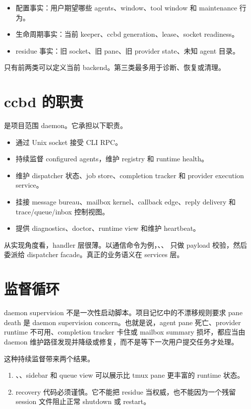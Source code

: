 \begin{itemize}
  \item 配置事实：用户期望哪些 agents、window、tool window 和 maintenance 行为。
  \item 生命周期事实：当前 keeper、ccbd generation、lease、socket readiness。
  \item residue 事实：旧 socket、旧 pane、旧 provider state、未知 agent 目录。
\end{itemize}

只有前两类可以定义当前 backend。第三类最多用于诊断、恢复或清理。

\section{ccbd 的职责}

 是项目范围 daemon。它承担以下职责。

\begin{itemize}
  \item 通过 Unix socket 接受 CLI RPC。
  \item 持续监督 configured agents，维护 registry 和 runtime health。
  \item 维护 dispatcher 状态、job store、completion tracker 和 provider execution service。
  \item 挂接 message bureau、mailbox kernel、callback edge、reply delivery 和 trace/queue/inbox 控制视图。
  \item 提供 diagnostics、doctor、runtime view 和维护 heartbeat。
\end{itemize}

从实现角度看，handler 层很薄。以通信命令为例，、、 只做 payload 校验，然后委派给 dispatcher facade。真正的业务语义在 services 层。

\section{监督循环}

daemon supervision 不是一次性启动脚本。项目记忆中的不漂移规则要求 pane death 是 daemon supervision concern。也就是说，agent pane 死亡、provider runtime 不可用、completion tracker 卡住或 mailbox summary 损坏，都应当由 daemon 维护路径发现并降级或修复，而不是等下一次用户提交任务才处理。

这种持续监督带来两个结果。

\begin{enumerate}
  \item {}、、sidebar 和 queue view 可以展示比 tmux pane 更丰富的 runtime 状态。
  \item recovery 代码必须谨慎。它不能把 residue 当权威，也不能因为一个残留 session 文件阻止正常 shutdown 或 restart。
\end{enumerate}

